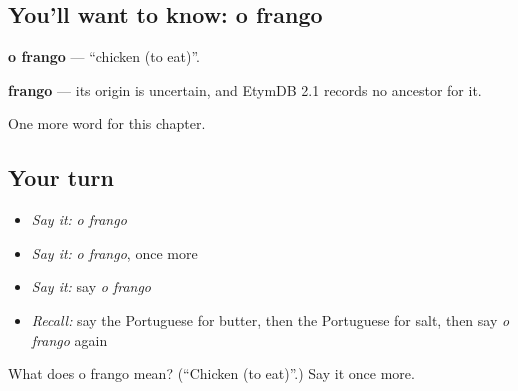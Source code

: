 \subsection*{You'll want to know: o frango}
\textbf{o frango} — \textquotedblleft{}chicken (to eat)\textquotedblright{}.

\begin{cousinweb}
\textbf{frango} — its origin is uncertain, and EtymDB 2.1 records no ancestor for it.
\end{cousinweb}

\begin{grammarlens}[title={What you've built}]
One more word for this chapter.
\end{grammarlens}

\subsection*{Your turn}
\begin{itemize}
\raggedright
  \item \emph{Say it:} \emph{o frango}
  \item \emph{Say it:} \emph{o frango}, once more
  \item \emph{Say it:} say \emph{o frango}
  \item \emph{Recall:} say the Portuguese for butter, then the Portuguese for salt, then say \emph{o frango} again
\end{itemize}

\begin{tcolorbox}[breakable,colback=teal!4,colframe=teal!35!black,title={Before you move on}]
What does o frango mean? (\textquotedblleft{}Chicken (to eat)\textquotedblright{}.) Say it once more.
\end{tcolorbox}
